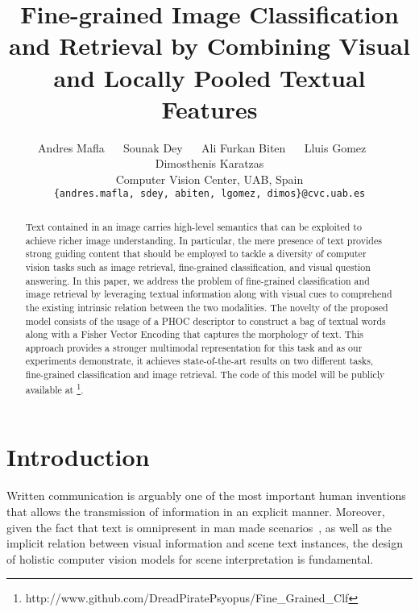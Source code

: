 \documentclass[10pt,twocolumn,letterpaper]{article}
\begin{document}
\title{Fine-grained Image Classification and Retrieval by Combining Visual and Locally Pooled Textual Features}

\author{Andres Mafla ~~ Sounak Dey ~~ Ali Furkan Biten ~~ Lluis Gomez ~~ Dimosthenis Karatzas\\
Computer Vision Center, UAB, Spain\\
{\tt\small \{andres.mafla, sdey, abiten, lgomez, dimos\}@cvc.uab.es}
}




\maketitle
\ifwacvfinal\thispagestyle{empty}\fi

\begin{abstract}
Text contained in an image carries high-level semantics that can be exploited to achieve richer image understanding. In particular, the mere presence of text provides strong guiding content that should be employed to tackle a diversity of computer vision tasks such as image retrieval, fine-grained classification, and visual question answering.
In this paper, we address the problem of fine-grained classification and image retrieval by leveraging textual information along with visual cues to comprehend the existing intrinsic relation between the two modalities. The novelty of the proposed model consists of the usage of a PHOC descriptor to construct a bag of textual words along with a Fisher Vector Encoding that captures the morphology of text. This approach provides a stronger multimodal representation for this task and as our experiments demonstrate, it achieves state-of-the-art results on two different tasks, fine-grained classification and image retrieval. 
The code of this model will be publicly available at 
\footnote{http://www.github.com/DreadPiratePsyopus/Fine\_Grained\_Clf}.
\end{abstract}

\section{Introduction}
Written communication is arguably one of the most important human inventions
that allows the transmission of information in an explicit manner. Moreover, given the fact that text is omnipresent in man made scenarios~\cite{veit2016coco, karatzas2015icdar}, as well as the implicit relation between visual information and scene text instances, the design of holistic computer vision models for scene interpretation is fundamental.
\end{document}
